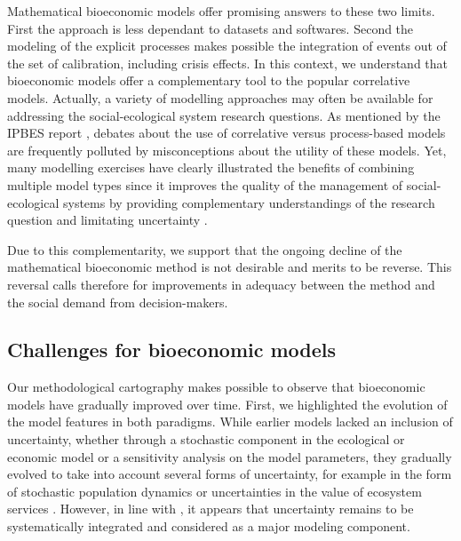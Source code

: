 Mathematical bioeconomic models offer promising answers to these two limits. First the approach is less dependant to datasets and softwares. Second the modeling of the explicit processes makes possible the integration of events out of the set of calibration, including crisis effects. In this context, we understand that bioeconomic models offer a complementary tool to the popular correlative models. Actually, a variety of modelling approaches may often be available
for addressing the social-ecological system research questions. As mentioned by the IPBES report \citep{IPBES2016}, debates about the use of correlative versus process-based models are frequently polluted by misconceptions about the utility of these models. Yet, many modelling exercises have clearly illustrated the benefits of combining multiple model types since it improves  the quality of the management of social-ecological systems by providing complementary understandings of the research question and limitating uncertainty \citep{Cheaib2012,Gritti2013,Oijen2013}.

Due to this complementarity, we support that the ongoing decline of the mathematical bioeconomic method is not desirable and merits to be reverse. This reversal calls therefore for improvements in adequacy between the method and the social demand from decision-makers. 


\subsection{Challenges for bioeconomic models}

Our methodological cartography makes possible to observe that bioeconomic models have gradually improved over time.
First, we highlighted the evolution of the model features in both paradigms. While earlier models lacked an inclusion of uncertainty, whether through a stochastic component in the ecological or economic model or a sensitivity analysis on the model parameters, they gradually evolved to take into account several forms of uncertainty, for example in the form of stochastic population dynamics \citep{Bulte1999} or uncertainties in the value of ecosystem services \citep{AugeraudVeron2019}. However, in line with \cite{Drechsler20200}, it appears that uncertainty remains to be systematically integrated and considered as a major modeling component.

